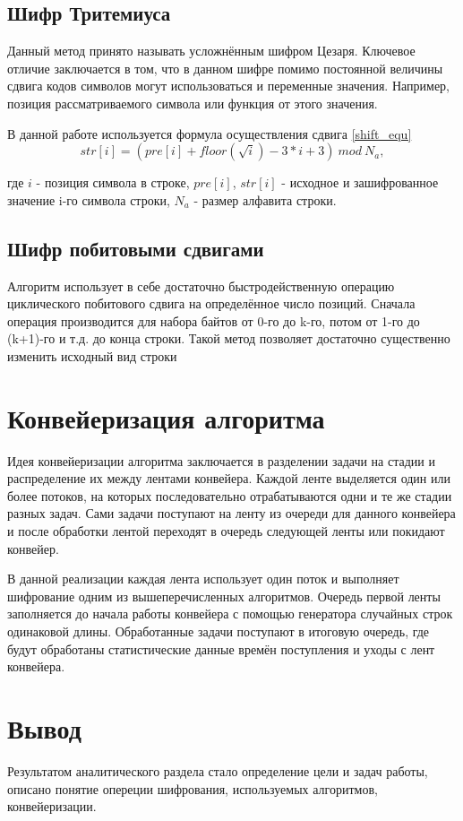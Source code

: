 \subsection{Шифр Тритемиуса}
	Данный метод принято называть усложнённым шифром Цезаря. Ключевое отличие заключается в том, что в данном шифре помимо постоянной величины сдвига кодов символов могут использоваться и переменные значения. Например, позиция рассматриваемого символа или функция от этого значения.
	
	В данной работе используется формула осуществления сдвига \ref{shift_equ}
	\begin{equation}\label{shift_equ}
		str[i] = (pre[i] + floor(\sqrt{i}) - 3*i + 3)\:mod\:N_a,
	\end{equation}
	
	где 
	$i$ - позиция символа в строке, 
	$pre[i]$, $str[i]$ - исходное и зашифрованное значение i-го символа строки, 
	$N_a$ - размер алфавита строки.

\subsection{Шифр побитовыми сдвигами}
	Алгоритм использует в себе достаточно быстродейственную операцию циклического побитового сдвига на определённое число позиций. Сначала операция производится для набора байтов от 0-го до k-го, потом от 1-го до (k+1)-го и т.д. до конца строки. Такой метод позволяет достаточно существенно изменить исходный вид строки

\section{Конвейеризация алгоритма}
Идея конвейеризации алгоритма заключается в разделении задачи на стадии и распределение их между лентами конвейера. Каждой ленте выделяется один или более потоков, на которых последовательно отрабатываются одни и те же стадии разных задач. Сами задачи поступают на ленту из очереди для данного конвейера и после обработки лентой переходят в очередь следующей ленты или покидают конвейер.

В данной реализации каждая лента использует один поток и выполняет шифрование одним из вышеперечисленных алгоритмов. Очередь первой ленты заполняется до начала работы конвейера с помощью генератора случайных строк одинаковой длины. Обработанные задачи поступают в итоговую очередь, где будут обработаны статистические данные времён поступления и уходы с лент конвейера.

\section*{Вывод}
Результатом аналитического раздела стало определение цели и задач работы, описано понятие опереции шифрования, используемых алгоритмов, конвейеризации.